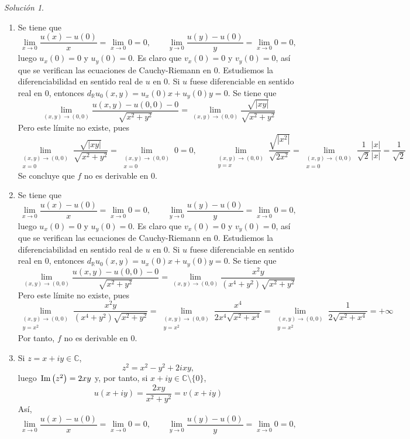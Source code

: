 \documentclass[11pt]{report}
\newcommand{\R}{\mathbb R}
\newcommand{\C}{\mathbb C}
\newcommand{\pars}[1]{\left( #1 \right)} %
\renewcommand{\Im}[1]{\,\textup{Im}\pars{#1}}
\theoremstyle{remark}
\newtheorem*{resolution}{Solución}
\begin{document}
\begin{resolution}
\begin{enumerate}
    \item Se tiene que
    \[\lim_{x \to 0} \frac{u(x)-u(0)}{x} = \lim_{x \to 0} 0 = 0, \qquad \lim_{y \to 0} \frac{u(y)-u(0)}{y} = \lim_{x \to 0} 0 = 0,\]
    luego $u_x(0)=0$ y $u_y(0)=0$. Es claro que $v_x(0) = 0$ y $v_y(0)=0$, así que se verifican las ecuaciones de Cauchy-Riemann en $0$. Estudiemos la diferenciabilidad en sentido real de $u$ en 0. Si $u$ fuese diferenciable en sentido real en $0$, entonces $d_\R u_0(x,y) = u_x(0)x+u_y(0)y = 0$. Se tiene que
    \[\lim_{(x,y) \to (0,0)} \frac{u(x,y)-u(0,0)-0}{\sqrt{x^2+y^2}} = \lim_{(x,y) \to (0,0)} \frac{\sqrt{|xy|}}{\sqrt{x^2+y^2}}\]
    Pero este límite no existe, pues
    \[\lim_{\substack{(x,y) \to (0,0) \\ x = 0}} \frac{\sqrt{|xy|}}{\sqrt{x^2+y^2}} = \lim_{\substack{(x,y) \to (0,0) \\ x = 0}} 0 = 0, \qquad \lim_{\substack{(x,y) \to (0,0) \\ y = x}} \frac{\sqrt{|x^2|}}{\sqrt{2x^2}} = \lim_{\substack{(x,y) \to (0,0) \\ x = 0}} \frac{1}{\sqrt{2}}\frac{|x|}{|x|} = \frac{1}{\sqrt{2}}\]
    Se concluye que $f$ no es derivable en $0$.
    \item Se tiene que
    \[\lim_{x \to 0} \frac{u(x)-u(0)}{x} = \lim_{x \to 0} 0 = 0, \qquad \lim_{y \to 0} \frac{u(y)-u(0)}{y} = \lim_{x \to 0} 0 = 0,\]
    luego $u_x(0)=0$ y $u_y(0)=0$. Es claro que $v_x(0) = 0$ y $v_y(0)=0$, así que se verifican las ecuaciones de Cauchy-Riemann en $0$. Estudiemos la diferenciabilidad en sentido real de $u$ en 0. Si $u$ fuese diferenciable en sentido real en $0$, entonces $d_\R u_0(x,y) = u_x(0)x+u_y(0)y = 0$. Se tiene que
    \[\lim_{(x,y) \to (0,0)} \frac{u(x,y)-u(0,0)-0}{\sqrt{x^2+y^2}} = \lim_{(x,y) \to (0,0)} \frac{x^2y}{(x^4+y^2)\sqrt{x^2+y^2}}\]
    Pero este límite no existe, pues
    \[\lim_{\substack{(x,y) \to (0,0) \\ y=x^2}} \frac{x^2y}{(x^4+y^2)\sqrt{x^2+y^2}}=\lim_{\substack{(x,y) \to (0,0) \\ y=x^2}} \frac{x^4}{2x^4\sqrt{x^2+x^4}} = \lim_{\substack{(x,y) \to (0,0) \\ y=x^2}} \frac{1}{2\sqrt{x^2+x^4}} = +\infty\]
    Por tanto, $f$ no es derivable en 0.
    \item Si $z =x+iy \in \C$,
    \[z^2 = x^2-y^2+2ixy,\]
    luego $\Im{z^2} = 2xy$ y, por tanto, si $x+iy \in \C \setminus \{0\}$,
    \[u(x+iy) = \frac{2xy}{x^2+y^2} = v(x+iy)\]
    Así,
    \[\lim_{x \to 0} \frac{u(x)-u(0)}{x} = \lim_{x \to 0} 0 = 0, \qquad \lim_{y \to 0} \frac{u(y)-u(0)}{y} = \lim_{x \to 0} 0 = 0,\]

\end{enumerate}
\end{resolution}
\end{document}
